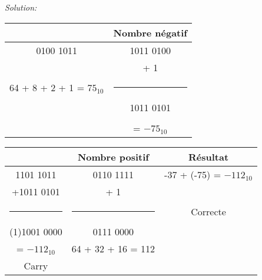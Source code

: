 \documentclass{article}
\newenvironment{solution}
    {\textit{Solution:}}
    {}
\begin{document}
\begin{solution}
\begin{enumerate}
        \begin{tabular}{|c|c|}
        \hline
        & Nombre négatif\\
        \hline    
        0100 1011                   &       1011 0100           \\
                                    &       + \hspace{25pt} 1   \\
        64 + 8 + 2 + 1 = $75_{10}$  &       \rule{1in}{1pt}     \\
        \hspace{5pt}                &       1011 0101           \\
        \hspace{100pt}              &       \hspace{100pt}      \\
                                    &       = $-75_{10}$        \\
        \hline
        \end{tabular}
        
        \hspace{40pt}
        
        \begin{tabular}{|c|c|c|}
        \hline
        & Nombre positif & Résultat \\
        \hline
        \hspace{6pt}1101 1011       &       0110 1111                   &       -37 + (-75) = $-112_{10}$         \\
        +1011 0101                  &       + \hspace{25pt} 1           &                                         \\
        \rule{1in}{1pt}             &       \rule{1in}{1pt}             &       Correcte                          \\
        (1)1001 0000                &       0111 0000                   &                                         \\
        \hspace{33pt} = $-112_{10}$ \hspace{20pt}  &       64 + 32 + 16 = 112   &                                   \\
        Carry                       &       \hspace{100pt}              &      \hspace{100pt}                     \\
        \hline
        \end{tabular}
        

\end{enumerate}
\end{solution}
\end{document}
